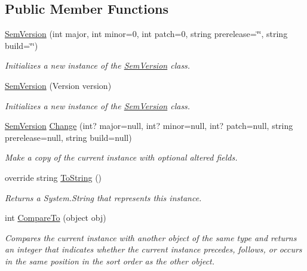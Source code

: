 \subsection*{Public Member Functions}
\begin{DoxyCompactItemize}
\item 
\mbox{\hyperlink{class_semver_1_1_sem_version_aa0c5f4dbdd36760ada7bd67a65030f7a}{Sem\+Version}} (int major, int minor=0, int patch=0, string prerelease=\char`\"{}\char`\"{}, string build=\char`\"{}\char`\"{})
\begin{DoxyCompactList}\small\item\em Initializes a new instance of the \mbox{\hyperlink{class_semver_1_1_sem_version}{Sem\+Version}} class. \end{DoxyCompactList}\item 
\mbox{\hyperlink{class_semver_1_1_sem_version_aded2959db05983a3041020acf415eecb}{Sem\+Version}} (Version version)
\begin{DoxyCompactList}\small\item\em Initializes a new instance of the \mbox{\hyperlink{class_semver_1_1_sem_version}{Sem\+Version}} class. \end{DoxyCompactList}\item 
\mbox{\hyperlink{class_semver_1_1_sem_version}{Sem\+Version}} \mbox{\hyperlink{class_semver_1_1_sem_version_a5d3a10589ea96a59aed64d65ab5f9c24}{Change}} (int? major=null, int? minor=null, int? patch=null, string prerelease=null, string build=null)
\begin{DoxyCompactList}\small\item\em Make a copy of the current instance with optional altered fields. \end{DoxyCompactList}\item 
override string \mbox{\hyperlink{class_semver_1_1_sem_version_a6a2cd954a8993437f925b94d1c54b59c}{To\+String}} ()
\begin{DoxyCompactList}\small\item\em Returns a System.\+String that represents this instance. \end{DoxyCompactList}\item 
int \mbox{\hyperlink{class_semver_1_1_sem_version_aef2d58904fc4226c0f4688de353e8204}{Compare\+To}} (object obj)
\begin{DoxyCompactList}\small\item\em Compares the current instance with another object of the same type and returns an integer that indicates whether the current instance precedes, follows, or occurs in the same position in the sort order as the other object. \end{DoxyCompactList}\item 

\end{DoxyCompactItemize}
